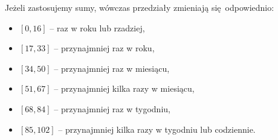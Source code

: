 Jeżeli zastosujemy sumy, wówczas przedziały zmieniają się odpowiednio:
\begin{itemize}
\item $[0, 16]$ -- raz w roku lub rzadziej,
\item $[17, 33]$ -- przynajmniej raz w roku,
\item $[34, 50]$ -- przynajmniej raz w miesiącu,
\item $[51, 67]$ -- przynajmniej kilka razy w miesiącu,
\item $[68, 84]$ -- przynajmniej raz w tygodniu,
\item $[85, 102]$ -- przynajmniej kilka razy w tygodniu lub codziennie. 
\end{itemize}
